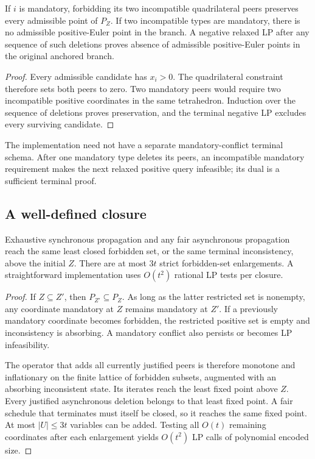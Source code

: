 \begin{theorem}\label{thm:preservation}
If $i$ is mandatory, forbidding its two incompatible quadrilateral peers preserves every admissible point of $P_Z$. If two incompatible types are mandatory, there is no admissible positive-Euler point in the branch. A negative relaxed LP after any sequence of such deletions proves absence of admissible positive-Euler points in the original anchored branch.
\end{theorem}
\begin{proof}
Every admissible candidate has $x_i>0$. The quadrilateral constraint therefore sets both peers to zero. Two mandatory peers would require two incompatible positive coordinates in the same tetrahedron. Induction over the sequence of deletions proves preservation, and the terminal negative LP excludes every surviving candidate.
\end{proof}

The implementation need not have a separate mandatory-conflict terminal schema. After one mandatory type deletes its peers, an incompatible mandatory requirement makes the next relaxed positive query infeasible; its dual is a sufficient terminal proof.

\subsection{A well-defined closure}

\begin{theorem}\label{thm:closure}
Exhaustive synchronous propagation and any fair asynchronous propagation reach the same least closed forbidden set, or the same terminal inconsistency, above the initial $Z$. There are at most $3t$ strict forbidden-set enlargements. A straightforward implementation uses $O(t^2)$ rational LP tests per closure.
\end{theorem}
\begin{proof}
If $Z\subseteq Z'$, then $P_{Z'}\subseteq P_Z$. As long as the latter restricted set is nonempty, any coordinate mandatory at $Z$ remains mandatory at $Z'$. If a previously mandatory coordinate becomes forbidden, the restricted positive set is empty and inconsistency is absorbing. A mandatory conflict also persists or becomes LP infeasibility.

The operator that adds all currently justified peers is therefore monotone and inflationary on the finite lattice of forbidden subsets, augmented with an absorbing inconsistent state. Its iterates reach the least fixed point above $Z$. Every justified asynchronous deletion belongs to that least fixed point. A fair schedule that terminates must itself be closed, so it reaches the same fixed point. At most $|U|\le3t$ variables can be added. Testing all $O(t)$ remaining coordinates after each enlargement yields $O(t^2)$ LP calls of polynomial encoded size.
\end{proof}

